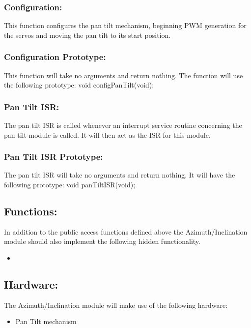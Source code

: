 \documentclass[]{article}
\begin{document}
\subsubsection{Configuration:}
This function configures the pan tilt mechanism, beginning PWM generation for the servos and moving the pan tilt to its start position.

\subsubsection{Configuration Prototype:}
This function will take no arguments and return nothing. The function will use the following prototype: \newline \newline
void configPanTilt(void);

\subsubsection{Pan Tilt ISR:}
The pan tilt ISR is called whenever an interrupt service routine concerning the pan tilt module is called. It will then act as the ISR for this module.

\subsubsection{Pan Tilt ISR Prototype:}
The pan tilt ISR will take no arguments and return nothing. It will have the following prototype: \newline \newline 
void panTiltISR(void);

\subsection{Functions:}
In addition to the public access functions defined above the Azimuth/Inclination module should also implement the following hidden functionality.
\begin{itemize}
	\item 
\end{itemize}

\subsection{Hardware:}
The Azimuth/Inclination module will make use of the following hardware:
\begin{itemize}
	\item Pan Tilt mechanism
\end{itemize}
\end{document}
